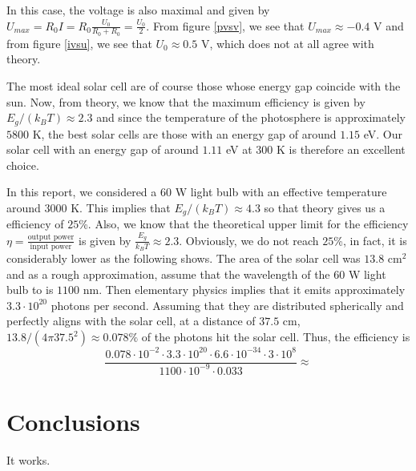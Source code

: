 \documentclass[a4paper]{article}
\begin{document}
In this case, the voltage is also maximal and given by $U_{max}=R_0I=R_0\frac{U_0}{R_0+R_0}=\frac{U_0}{2}$.
From figure \ref{pvsv}, we see that $U_{max}\approx -0.4$ V and from figure \ref{ivsu}, we see that $U_0\approx 0.5$ V, which does not at all agree with theory.

The most ideal solar cell are of course those whose energy gap coincide with the sun. Now, from theory, we know that the maximum efficiency is given by $E_g/(k_BT)\approx 2.3$ and since the temperature of the photosphere is approximately $5800$ K, the best solar cells are those with an energy gap of around $1.15$ eV.
Our solar cell with an energy gap of around $1.11$ eV at $300$ K is therefore an excellent choice.

In this report, we considered a $60$ W light bulb with an effective temperature around $3000$ K. This implies that $E_g/(k_B T)\approx 4.3$ so that theory gives us a efficiency of $25$\%.
Also, we know that the theoretical upper limit for the efficiency $\eta=\frac{\text{output power}}{\text{input power}}$ is given by $\frac{E_g}{k_B T}\approx 2.3$.
Obviously, we do not reach $25$\%, in fact, it is considerably lower as the following shows.
The area of the solar cell was $13.8$ cm${}^2$ and as a rough approximation, assume that the wavelength of the $60$ W light bulb to is $1100$ nm. Then elementary physics implies that it emits approximately $3.3\cdot 10^{20}$ photons per second. Assuming that they are distributed spherically and perfectly aligns with the solar cell, at a distance of $37.5$ cm, $13.8/(4\pi 37.5^2)\approx 0.078 \%$ of the photons hit the solar cell.
Thus, the efficiency is 
\begin{displaymath}
\frac{0.078\cdot 10^{-2}\cdot 3.3\cdot 10^{20}\cdot 6.6\cdot 10^{-34}\cdot 3\cdot 10^8}{1100\cdot 10^{-9}\cdot 0.033 }\approx
\end{displaymath}

\section{Conclusions}

It works.
\end{document}

